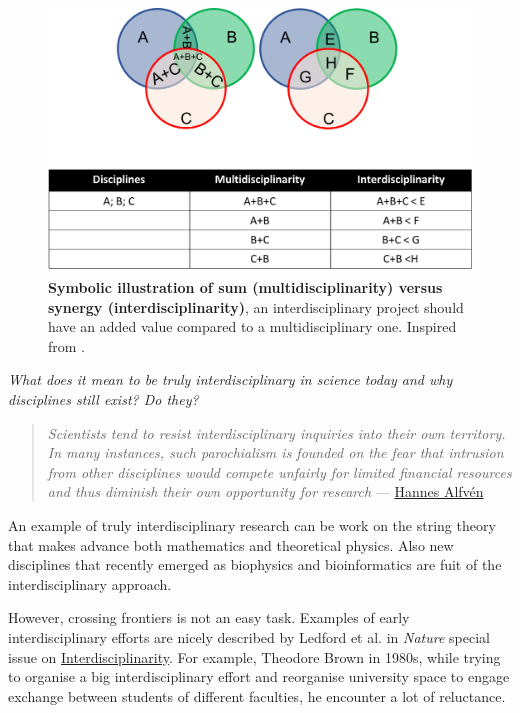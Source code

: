 \documentclass[12pt,]{book}
\theoremstyle{definition}
\theoremstyle{definition}
\theoremstyle{definition}
\theoremstyle{remark}
\begin{document}
\begin{figure}

{\centering \includegraphics[width=1\linewidth]{figures-ext/multidisc} 

}

\caption{\textbf{Symbolic illustration of sum
(multidisciplinarity) versus synergy (interdisciplinarity)}, an
interdisciplinary project should have an added value compared to a
multidisciplinary one. Inspired from \citep{Slavicek2012}.}\label{fig:multidisc}
\end{figure}






\emph{What does it mean to be truly interdisciplinary in science today
and why disciplines still exist? Do they?}

\begin{quote}
\emph{Scientists tend to resist interdisciplinary inquiries into their
own territory. In many instances, such parochialism is founded on the
fear that intrusion from other disciplines would compete unfairly for
limited financial resources and thus diminish their own opportunity for
research} ---
\href{http://www.azquotes.com/author/28130-Hannes_Alfven}{Hannes Alfvén}
\end{quote}

An example of truly interdisciplinary research can be work on the string
theory that makes advance both mathematics and theoretical physics. Also
new disciplines that recently emerged as biophysics and bioinformatics
are fuit of the interdisciplinary approach.

However, crossing frontiers is not an easy task. Examples of early
interdisciplinary efforts are nicely described by Ledford et al.
\citep{Ledford2015} in \emph{Nature} special issue on
\href{https://www.nature.com/news/interdisciplinarity-1.18295}{Interdisciplinarity}.
For example, Theodore Brown in 1980s, while trying to organise a big
interdisciplinary effort and reorganise university space to engage
exchange between students of different faculties, he encounter a lot of
reluctance.
\end{document}
